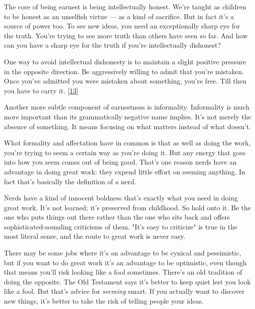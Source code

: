 The core of being
                  earnest is being intellectually honest. We're taught as
                  children to be honest as an unselfish virtue --- as a kind
                  of sacrifice. But in fact it's a source of power too. To see
                  new ideas, you need an exceptionally sharp eye for the truth.
                  You're trying to see more truth than others have seen so far.
                  And how can you have a sharp eye for the truth if you're
                  intellectually dishonest?

One way to avoid
                  intellectual dishonesty is to maintain a slight positive
                  pressure in the opposite direction. Be aggressively willing to
                  admit that you're mistaken. Once you've admitted you were
                  mistaken about something, you're free. Till then you have to
                  carry it.
                  [\href{\#f13n}{13}]

Another more subtle component of earnestness is
                  informality. Informality is much more important than its
                  grammatically negative name implies. It's not merely the
                  absence of something. It means focusing on what matters
                  instead of what doesn't.

What formality and
                  affectation have in common is that as well as doing the work,
                  you're trying to seem a certain way as you're doing it. But
                  any energy that goes into how you seem comes out of being
                  good. That's one reason nerds have an advantage in doing great
                  work: they expend little effort on seeming anything. In fact
                  that's basically the definition of a nerd.

Nerds
                  have a kind of innocent boldness that's exactly what you need
                  in doing great work. It's not learned; it's preserved from
                  childhood. So hold onto it. Be the one who puts things out
                  there rather than the one who sits back and offers
                  sophisticated-sounding criticisms of them. "It's easy to
                  criticize" is true in the most literal sense, and the route to
                  great work is never easy.

There may be some jobs
                  where it's an advantage to be cynical and pessimistic, but if
                  you want to do great work it's an advantage to be optimistic,
                  even though that means you'll risk looking like a fool
                  sometimes. There's an old tradition of doing the opposite. The
                  Old Testament says it's better to keep quiet lest you look
                  like a fool. But that's advice for \emph{seeming} smart. If
                  you actually want to discover new things, it's better to take
                  the risk of telling people your ideas.

